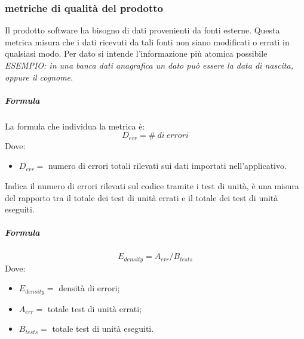 		\subsubsection{metriche di qualità del prodotto}
        Il prodotto software ha bisogno di dati provenienti da fonti esterne. Questa 
        metrica misura che i dati ricevuti da tali fonti non siano modificati o errati 
        in qualsiasi modo. Per dato si intende l'informazione più atomica possibile
        \textit{ESEMPIO: in una banca dati anagrafica un dato può essere la data di 
        nascita, oppure il cognome.}
        \subparagraph{Formula}
        La formula che individua la metrica è:
        \begin{displaymath}
          D_{err} = \#\ di\ errori
        \end{displaymath}
        Dove:
        \begin{itemize}
        \item[]$D_{err} =$  numero di errori totali rilevati sui dati importati 
        nell'applicativo.
        \end{itemize}
        Indica il numero di errori rilevati sul codice tramite i test di unità, è una 
        misura del rapporto tra il totale dei test di unità errati e il totale dei test 
        di unità eseguiti.
        \subparagraph{Formula}
        \begin{displaymath}
          E_{density} = A_{err}/B_{tests}
        \end{displaymath}
        Dove:
        \begin{itemize}
          \item[] $E_{density} =$ densità di errori;
          \item[] $A_{err} =$ totale test di unità errati;  
          \item[] $B_{tests} =$ totale test di unità eseguiti.
        \end{itemize}
        
